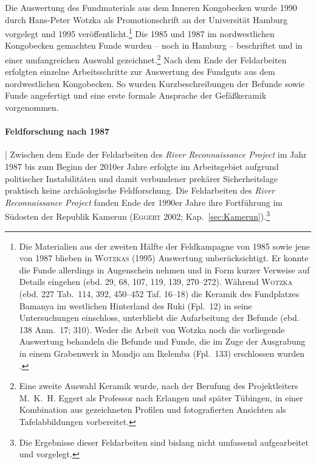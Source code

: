 \begin{multicols}{2}
Die Auswertung des Fundmaterials aus dem Inneren Kongobecken wurde 1990 durch Hans-Peter Wotzka als Promotionschrift an der Universität Hamburg vorgelegt und 1995 veröffentlicht.\footnote{Die Materialien aus der zweiten Hälfte der Feldkampagne von 1985 sowie jene von 1987 blieben in \textsc{Wotzkas} (1995) Auswertung unberücksichtigt. Er konnte die Funde allerdings in Augenschein nehmen und in Form kurzer Verweise auf Details eingehen (ebd. 29, 68, 107, 119, 139, 270--272). Während \textsc{Wotzka} (ebd. 227 Tab.~114, 392, 450--452 Taf. 16--18) die Keramik des Fundplatzes Bamanya im westlichen Hinterland des Ruki (Fpl.~12) in seine Untersuchungen einschloss, unterbliebt die Aufarbeitung der Befunde (ebd. 138 Anm.~17; 310). Weder die Arbeit von Wotzka noch die vorliegende Auswertung behandeln die Befunde und Funde, die im Zuge der Ausgrabung in einem Grabenwerk in Mondjo am Ikelemba (Fpl.~133) erschlossen wurden \parencite[3238--3240]{Eggert.1987}.} Die 1985 und 1987 im nordwestlichen Kongobecken gemachten Funde wurden -- noch in Hamburg -- beschriftet und in einer umfangreichen Auswahl gezeichnet.\footnote{Eine zweite Auswahl Keramik wurde, nach der Berufung des Projektleiters M.~K.~H. Eggert als Professor nach Erlangen und später Tübingen, in einer Kombination aus gezeichneten Profilen und fotografierten Ansichten als Tafelabbildungen vorbereitet.} Nach dem Ende der Feldarbeiten erfolgten einzelne Arbeitsschritte zur Auswertung des Fundguts aus dem nordwestlichen Kongobecken. So wurden Kurzbeschreibungen der Befunde sowie Funde angefertigt und eine erste formale Ansprache der Gefäßkeramik vorgenommen.

\paragraph{Feldforschung nach 1987}\label{sec:FeldforschModern}\hspace{-.5em}|\hspace{.5em}%
Zwischen dem Ende der Feldarbeiten des \textit{River Reconnaissance Project} im Jahr 1987 bis zum Beginn der 2010er Jahre erfolgte im Arbeitsgebiet aufgrund politischer Instabilitäten und damit verbundener prekärer Sicherheitslage praktisch keine archäologische Feldforschung. Die Feldarbeiten des \textit{River Reconnaissance Project} fanden Ende der 1990er Jahre ihre Fortführung im Südosten der Republik Kamerun (\textsc{Eggert} 2002; Kap.~\ref{sec:Kamerun}).\footnote{Die Ergebnisse dieser Feldarbeiten sind bislang nicht umfassend aufgearbeitet und vorgelegt.}


\end{multicols}

